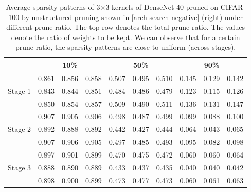\setlength{\tabcolsep}{5pt}
\renewcommand{\arraystretch}{1.2}
\begin{table}[!htbp]
\centering
\small
\begin{tabular}{c|ccc|ccc|ccl}
\hline
                         & \multicolumn{3}{c|}{10\%} & \multicolumn{3}{c|}{50\%} & \multicolumn{3}{c}{90\%} \\ \hline
\multirow{3}{*}{Stage 1} & 0.861   & 0.856  & 0.858  & 0.507   & 0.495  & 0.510  & 0.145  & 0.129  & 0.142  \\
                         & 0.843   & 0.844  & 0.851  & 0.484   & 0.486  & 0.479  & 0.123  & 0.115  & 0.126  \\
                         & 0.850   & 0.854  & 0.857  & 0.509   & 0.490  & 0.511  & 0.136  & 0.131  & 0.147  \\ \hline
\multirow{3}{*}{Stage 2} & 0.907   & 0.905  & 0.906  & 0.498   & 0.487  & 0.499  & 0.099  & 0.088  & 0.100  \\
                         & 0.892   & 0.888  & 0.892  & 0.442   & 0.427  & 0.444  & 0.064  & 0.043  & 0.065  \\
                         & 0.907   & 0.906  & 0.905  & 0.497   & 0.485  & 0.493  & 0.095  & 0.082  & 0.098  \\ \hline
\multirow{3}{*}{Stage 3} & 0.897   & 0.901  & 0.899  & 0.470   & 0.475  & 0.472  & 0.060  & 0.060  & 0.064  \\
                         & 0.888   & 0.890  & 0.889  & 0.433   & 0.437  & 0.435  & 0.040  & 0.040  & 0.042  \\
                         & 0.898   & 0.900  & 0.899  & 0.473   & 0.477  & 0.473  & 0.060  & 0.061  & 0.063  \\ \hline
\end{tabular}
\vspace{1ex}
  \caption{
      Average sparsity patterns of 3$\times$3 kernels of DenseNet-40 pruned on CIFAR-100 by unstructured pruning shown in \autoref{arch-search-negative} (right) under different prune ratio. The top row denotes the total prune ratio. The values denote the ratio of weights to be kept. We can observe that for a certain prune ratio, the sparsity patterns are close to uniform (across stages).}
\label{sparsity-8}
 \vspace{-2ex}
\end{table}

